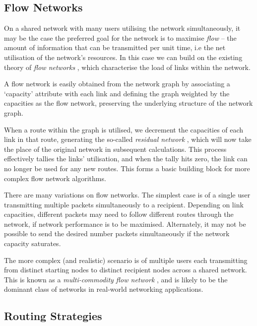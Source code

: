 \documentclass[aps,rmp,twocolumn,amsmath,amssymb,nofootinbib,superscriptaddress]{revtex4}
\begin{document}
%
%

\subsection{Flow Networks} \label{sec:flow_networks}

On a shared network with many users utilising the network simultaneously, it may be the case the preferred goal for the network is to maximise \emph{flow} \cite{???} -- the amount of information that can be transmitted per unit time, i.e the net utilisation of the network's resources. In this case we can build on the existing theory of \emph{flow networks} \cite{???}, which characterise the load of links within the network.

A flow network is easily obtained from the network graph by associating a `capacity' attribute with each link and defining the graph weighted by the capacities as the flow network, preserving the underlying structure of the network graph.

When a route within the graph is utilised, we decrement the capacities of each link in that route, generating the so-called \emph{residual network} \cite{???}, which will now take the place of the original network in subsequent calculations. This process effectively tallies the links' utilisation, and when the tally hits zero, the link can no longer be used for any new routes. This forms a basic building block for more complex flow network algorithms.

There are many variations on flow networks. The simplest case is of a single user transmitting multiple packets simultaneously to a recipient. Depending on link capacities, different packets may need to follow different routes through the network, if network performance is to be maximised. Alternately, it may not be possible to send the desired number packets simultaneously if the network capacity saturates.

The more complex (and realistic) scenario is of multiple users each transmitting from distinct starting nodes to distinct recipient nodes across a shared network. This is known as a \emph{multi-commodity flow network} \cite{???}, and is likely to be the dominant class of networks in real-world networking applications.

%
%

\subsection{Routing Strategies} \label{sec:route_strats}
\end{document}
